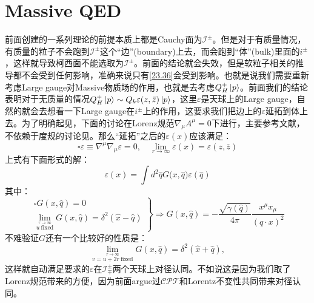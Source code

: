 \section{Massive QED}
前面创建的一系列理论的前提本质上都是Cauchy面为$\mathcal{I}^\pm$。但是对于有质量情况，有质量的粒子不会跑到$\mathcal{I}^\pm$这个“边”(boundary)上去，而会跑到“体”(bulk)里面的$i^{\pm}$，这样就导致柯西面不能选取为$\mathcal{I}^\pm$。前面的结论就会失效，但是软粒子相关的推导都不会受到任何影响，准确来说只有\ref{23.36}会受到影响。也就是说我们需要重新考虑Large gauge对Massive物质场的作用，也就是去考虑$Q^{+}_H\ket{p}$。前面我们的结论表明对于无质量的情况$Q^{+}_H\ket{p}\sim Q_k\varepsilon(z,\bar z)\ket{p}$，这里$\varepsilon$是天球上的Large gauge，自然的就会去想看一下Large gauge在$i^\pm$上的作用，这要求我们把边上的$\varepsilon$延拓到体上去。为了明确起见，下面的讨论在Lorenz规范$\nabla_\mu A^\mu=0$下进行，主要参考文献\cite{Campiglia:2015qka}，不依赖于度规的讨论见\cite{Kapec:2015ena}。那么“延拓”之后的$\varepsilon(x)$应该满足：
\begin{equation}
	\square\varepsilon\equiv\nabla^\mu\nabla_\mu\varepsilon=0,\quad \lim_{r\to\infty}\varepsilon(x)=\varepsilon(z,\bar z)
\end{equation}
上式有下面形式的解：
\begin{equation}
	\varepsilon(x)=\int d^2\hat{q}G\big(x,\hat{q}\big)\varepsilon(\hat{q})
\end{equation}
其中：
\begin{equation}
	\left.
	\begin{matrix}
		\square G(x,\hat{q})=0\\
		\lim_{\overset{r\to\infty}{u\ \text{fixed}}}G(x,\hat{q})=\delta^2(\hat{x}-\hat{q})
	\end{matrix}
	\right\}\Rightarrow G\left(x,\hat{q}\right)=-\frac{\sqrt{\gamma(\hat{q})}}{4\pi}\frac{x^{\mu}x_{\mu}}{(q\cdot x)^2}
\end{equation}
不难验证$G$还有一个比较好的性质是：
\[\lim_{\overset{r\to\infty}{v=u+2r\ \text{fixed}}}G(x,\hat{q})=\delta^2(\hat{x}+\hat{q}),\]
这样就自动满足要求的$\varepsilon$在$\mathcal{I}^\pm_\mp$两个天球上对径认同。不如说这是因为我们取了Lorenz规范带来的方便，因为前面argue过$\mathcal{CPT}$和Lorentz不变性共同带来对径认同。

